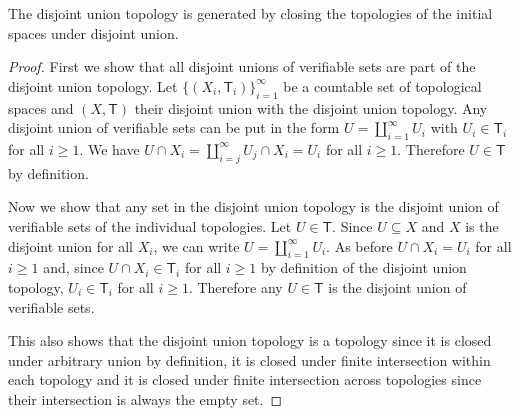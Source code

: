 \begin{mathSection}
	\begin{prop}\label{pm-cd-disjointUnionTopologyIsClosure}
		The disjoint union topology is generated by closing the topologies of the initial spaces under disjoint union.
	\end{prop}
	\begin{proof}
		First we show that all disjoint unions of verifiable sets are part of the disjoint union topology. Let $\{(X_i, \mathsf{T}_i)\}_{i=1}^{\infty}$ be a countable set of topological spaces and $(X, \mathsf{T})$ their disjoint union with the disjoint union topology. Any disjoint union of verifiable sets can be put in the form $U=\coprod\limits_{i=1}^{\infty} U_i$ with $U_i \in \mathsf{T}_i$ for all $i \geq 1$. We have $U \cap X_i = \coprod\limits_{i=j}^{\infty} U_j \cap X_i = U_i$ for all $i \geq 1$. Therefore $U \in \mathsf{T}$ by definition.
		
		Now we show that any set in the disjoint union topology is the disjoint union of verifiable sets of the individual topologies. Let $U \in \mathsf{T}$. Since $U \subseteq X$ and $X$ is the disjoint union for all $X_i$, we can write $U=\coprod\limits_{i=1}^{\infty} U_i$. As before $U \cap X_i = U_i$ for all $i \geq 1$ and, since $U \cap X_i \in \mathsf{T}_i$ for all $i \geq 1$ by definition of the disjoint union topology, $U_i \in \mathsf{T}_i$ for all $i \geq 1$. Therefore any $U \in \mathsf{T}$ is the disjoint union of verifiable sets.
		
		This also shows that the disjoint union topology is a topology since it is closed under arbitrary union by definition, it is closed under finite intersection within each topology and it is closed under finite intersection across topologies since their intersection is always the empty set.
	\end{proof}
	

\end{mathSection}
